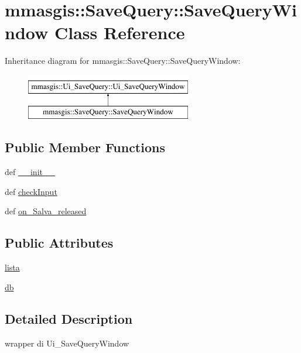 \hypertarget{classmmasgis_1_1SaveQuery_1_1SaveQueryWindow}{
\section{mmasgis::SaveQuery::SaveQueryWindow Class Reference}
\label{classmmasgis_1_1SaveQuery_1_1SaveQueryWindow}
}
Inheritance diagram for mmasgis::SaveQuery::SaveQueryWindow:\begin{figure}[H]
\begin{center}
\leavevmode
\includegraphics[height=2.000000cm]{classmmasgis_1_1SaveQuery_1_1SaveQueryWindow}
\end{center}
\end{figure}
\subsection*{Public Member Functions}
\begin{DoxyCompactItemize}
\item 
def \hyperlink{classmmasgis_1_1SaveQuery_1_1SaveQueryWindow_a08e1b7c441e8a796517e9a80a0c08b6b}{\_\-\_\-init\_\-\_\-}
\item 
def \hyperlink{classmmasgis_1_1SaveQuery_1_1SaveQueryWindow_afc8726fb931f8ff1d27ff64e45c6a7f8}{checkInput}
\item 
def \hyperlink{classmmasgis_1_1SaveQuery_1_1SaveQueryWindow_a78a78469d4c2a1b3456ae7de606c1246}{on\_\-Salva\_\-released}
\end{DoxyCompactItemize}
\subsection*{Public Attributes}
\begin{DoxyCompactItemize}
\item 
\hyperlink{classmmasgis_1_1SaveQuery_1_1SaveQueryWindow_ad95c09659404110b243e74947b5fb01a}{lista}
\item 
\hyperlink{classmmasgis_1_1SaveQuery_1_1SaveQueryWindow_a9372f208568cacc3e89243aebbdb4b56}{db}
\end{DoxyCompactItemize}


\subsection{Detailed Description}
\begin{DoxyVerb}
wrapper di Ui_SaveQueryWindow
\end{DoxyVerb}
 

